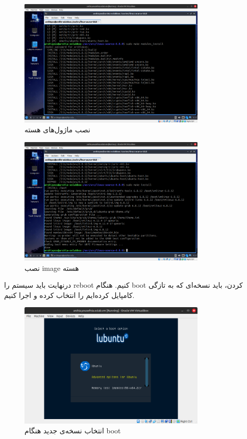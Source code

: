\documentclass[12pt]{article}
\begin{document}
        \begin{figure}[H]
		\centering
		\includegraphics[width=0.8\textwidth]{report1-resources/51.png}
		\caption{نصب ماژول‌های هسته}
	\end{figure}

        \begin{figure}[H]
		\centering
		\includegraphics[width=0.8\textwidth]{report1-resources/53.png}
		\caption{نصب image هسته}
	\end{figure}

        درنهایت باید سیستم را
        reboot
        کنیم. هنگام 
        boot
        کردن، باید نسخه‌ای که به تازگی کامپایل کرده‌ایم را انتخاب کرده و اجرا کنیم.

        \begin{figure}[H]
		\centering
		\includegraphics[width=0.8\textwidth]{report1-resources/54.png}
		\caption{انتخاب نسخه‌ی جدید هنگام boot}
	\end{figure}
\end{document}
